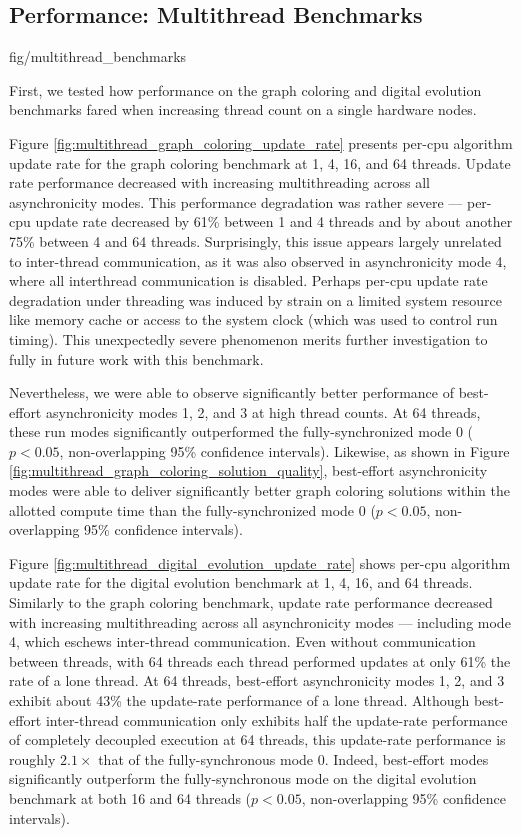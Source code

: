 \subsection{Performance: Multithread Benchmarks} \label{sec:multithread-benchmarks}

{fig/multithread_benchmarks}

First, we tested how performance on the graph coloring and digital evolution benchmarks fared when increasing thread count on a single hardware nodes.

Figure \ref{fig:multithread_graph_coloring_update_rate} presents per-cpu algorithm update rate for the graph coloring benchmark at 1, 4, 16, and 64 threads.
Update rate performance decreased with increasing multithreading across all asynchronicity modes.
This performance degradation was rather severe --- per-cpu update rate decreased by 61\% between 1 and 4 threads and by about another 75\% between 4 and 64 threads.
Surprisingly, this issue appears largely unrelated to inter-thread communication, as it was also observed in asynchronicity mode 4, where all interthread communication is disabled.
Perhaps per-cpu update rate degradation under threading was induced by strain on a limited system resource like memory cache or access to the system clock (which was used to control run timing).
This unexpectedly severe phenomenon merits further investigation to fully in future work with this benchmark.

Nevertheless, we were able to observe significantly better performance of best-effort asynchronicity modes 1, 2, and 3 at high thread counts.
At 64 threads, these run modes significantly outperformed the fully-synchronized mode 0 ($p < 0.05$, non-overlapping 95\% confidence intervals).
Likewise, as shown in Figure \ref{fig:multithread_graph_coloring_solution_quality}, best-effort asynchronicity modes were able to deliver significantly better graph coloring solutions within the allotted compute time than the fully-synchronized mode 0 ($p < 0.05$, non-overlapping 95\% confidence intervals).

Figure \ref{fig:multithread_digital_evolution_update_rate} shows per-cpu algorithm update rate for the digital evolution benchmark at 1, 4, 16, and 64 threads.
Similarly to the graph coloring benchmark, update rate performance decreased with increasing multithreading across all asynchronicity modes --- including mode 4, which eschews inter-thread communication.
Even without communication between threads, with 64 threads each thread performed updates at only 61\% the rate of a lone thread.
At 64 threads, best-effort asynchronicity modes 1, 2, and 3 exhibit about 43\% the update-rate performance of a lone thread.
Although best-effort inter-thread communication only exhibits half the update-rate performance of completely decoupled execution at 64 threads, this update-rate performance is roughly $2.1\times$ that of the fully-synchronous mode 0.
Indeed, best-effort modes significantly outperform the fully-synchronous mode on the digital evolution benchmark at both 16 and 64 threads ($p < 0.05$, non-overlapping 95\% confidence intervals).
